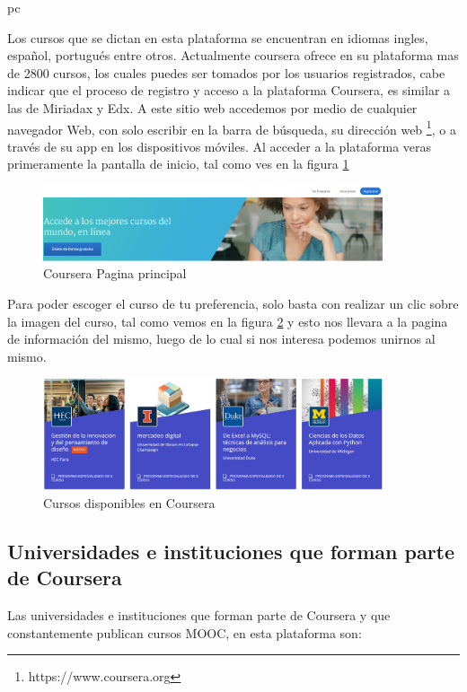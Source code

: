 pc\documentclass[a4paper,12pt,openany]{book}
\begin{document}
Los cursos que se dictan en esta plataforma se encuentran en idiomas ingles, español, portugués entre otros. Actualmente coursera ofrece en su plataforma mas de 2800 cursos, los cuales puedes ser tomados por los usuarios registrados, cabe indicar que el proceso de registro y acceso a la plataforma Coursera, es similar a las de Miriadax y Edx. A este sitio web accedemos por medio de  cualquier navegador Web, con solo escribir en la barra de búsqueda, su dirección web \footnote{https://www.coursera.org}, o a través de su app en los dispositivos móviles. Al acceder a la plataforma veras primeramente la pantalla de inicio, tal como ves en la figura \ref{fig:coursera1}

\begin{figure}[ht]
  \centering
	\includegraphics[width=10cm]{coursera1.png}
\caption{Coursera Pagina principal}
  \label{fig:coursera1}
\end{figure}

Para poder escoger el curso de tu preferencia, solo basta con realizar un clic sobre la imagen del curso, tal como vemos en la figura \ref{fig:coursera2} y esto nos llevara a la pagina de información del mismo, luego de lo cual si nos interesa podemos unirnos al mismo.

\begin{figure}[H]
  \centering
	\includegraphics[width=10cm]{coursera-cursos.png}
\caption{Cursos disponibles en Coursera}
  \label{fig:coursera2}
\end{figure}


\clearpage
\subsection{Universidades e instituciones que forman parte de Coursera}

Las universidades e instituciones que forman parte de Coursera y que constantemente publican cursos MOOC, en esta plataforma son:
\end{document}
